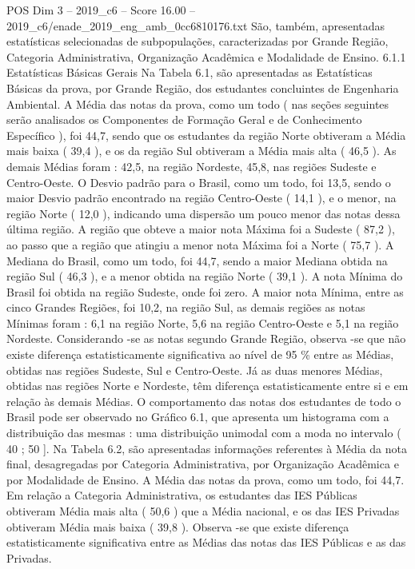 \begin{textsample}{POS Dim 3 – 2019\_c6 – Score 16.00 – 2019\_c6/enade\_2019\_eng\_amb\_0cc6810176.txt}
São, também, apresentadas estatísticas selecionadas de subpopulações, caracterizadas por Grande Região, Categoria Administrativa, Organização Acadêmica e Modalidade de Ensino. 6.1.1 Estatísticas Básicas Gerais Na Tabela 6.1, são apresentadas as Estatísticas Básicas da prova, por Grande Região, dos estudantes concluintes de Engenharia Ambiental.
A Média das notas da prova, como um todo ( nas seções seguintes serão analisados os Componentes de Formação Geral e de Conhecimento Específico ), foi 44,7, sendo que os estudantes da região Norte obtiveram a Média mais baixa ( 39,4 ), e os da região Sul obtiveram a Média mais alta ( 46,5 ).
As demais Médias foram : 42,5, na região Nordeste, 45,8, nas regiões Sudeste e Centro-Oeste.
O Desvio padrão para o Brasil, como um todo, foi 13,5, sendo o maior Desvio padrão encontrado na região Centro-Oeste ( 14,1 ), e o menor, na região Norte ( 12,0 ), indicando uma dispersão um pouco menor das notas dessa última região.
A região que obteve a maior nota Máxima foi a Sudeste ( 87,2 ), ao passo que a região que atingiu a menor nota Máxima foi a Norte ( 75,7 ).
A Mediana do Brasil, como um todo, foi 44,7, sendo a maior Mediana obtida na região Sul ( 46,3 ), e a menor obtida na região Norte ( 39,1 ).
A nota Mínima do Brasil foi obtida na região Sudeste, onde foi zero.
A maior nota Mínima, entre as cinco Grandes Regiões, foi 10,2, na região Sul, as demais regiões as notas Mínimas foram : 6,1 na região Norte, 5,6 na região Centro-Oeste e 5,1 na região Nordeste.
Considerando -se as notas segundo Grande Região, observa -se que não existe diferença estatisticamente significativa ao nível de 95 \% entre as Médias, obtidas nas regiões Sudeste, Sul e Centro-Oeste.
Já as duas menores Médias, obtidas nas regiões Norte e Nordeste, têm diferença estatisticamente entre si e em relação às demais Médias.
O comportamento das notas dos estudantes de todo o Brasil pode ser observado no Gráfico 6.1, que apresenta um histograma com a distribuição das mesmas : uma distribuição unimodal com a moda no intervalo ( 40 ; 50 ].
Na Tabela 6.2, são apresentadas informações referentes à Média da nota final, desagregadas por Categoria Administrativa, por Organização Acadêmica e por Modalidade de Ensino.
A Média das notas da prova, como um todo, foi 44,7.
Em relação a Categoria Administrativa, os estudantes das IES Públicas obtiveram Média mais alta ( 50,6 ) que a Média nacional, e os das IES Privadas obtiveram Média mais baixa ( 39,8 ).
Observa -se que existe diferença estatisticamente significativa entre as Médias das notas das IES Públicas e as das Privadas.

\end{textsample}
